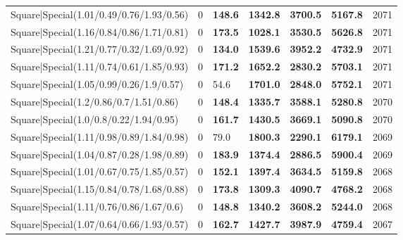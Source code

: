 \begin{tabular}{lrllllr}
 Square|Special(1.01/0.49/0.76/1.93/0.56)                      &             0   & \textbf{148.6} & \textbf{1342.8} & \textbf{3700.5} & \textbf{5167.8} &         2071 \\
 Square|Special(1.16/0.84/0.86/1.71/0.81)                      &             0   & \textbf{173.5} & \textbf{1028.1} & \textbf{3530.5} & \textbf{5626.8} &         2071 \\
 Square|Special(1.21/0.77/0.32/1.69/0.92)                      &             0   & \textbf{134.0} & \textbf{1539.6} & \textbf{3952.2} & \textbf{4732.9} &         2071 \\
 Square|Special(1.11/0.74/0.61/1.85/0.93)                      &             0   & \textbf{171.2} & \textbf{1652.2} & \textbf{2830.2} & \textbf{5703.1} &         2071 \\
 Square|Special(1.05/0.99/0.26/1.9/0.57)                       &             0   & 54.6           & \textbf{1701.0} & \textbf{2848.0} & \textbf{5752.1} &         2071 \\
 Square|Special(1.2/0.86/0.7/1.51/0.86)                        &             0   & \textbf{148.4} & \textbf{1335.7} & \textbf{3588.1} & \textbf{5280.8} &         2070 \\
 Square|Special(1.0/0.8/0.22/1.94/0.95)                        &             0   & \textbf{161.7} & \textbf{1430.5} & \textbf{3669.1} & \textbf{5090.8} &         2070 \\
 Square|Special(1.11/0.98/0.89/1.84/0.98)                      &             0   & 79.0           & \textbf{1800.3} & \textbf{2290.1} & \textbf{6179.1} &         2069 \\
 Square|Special(1.04/0.87/0.28/1.98/0.89)                      &             0   & \textbf{183.9} & \textbf{1374.4} & \textbf{2886.5} & \textbf{5900.4} &         2069 \\
 Square|Special(1.01/0.67/0.75/1.85/0.57)                      &             0   & \textbf{152.1} & \textbf{1397.4} & \textbf{3634.5} & \textbf{5159.8} &         2068 \\
 Square|Special(1.15/0.84/0.78/1.68/0.88)                      &             0   & \textbf{173.8} & \textbf{1309.3} & \textbf{4090.7} & \textbf{4768.2} &         2068 \\
 Square|Special(1.11/0.76/0.86/1.67/0.6)                       &             0   & \textbf{148.8} & \textbf{1340.2} & \textbf{3608.2} & \textbf{5244.0} &         2068 \\
 Square|Special(1.07/0.64/0.66/1.93/0.57)                      &             0   & \textbf{162.7} & \textbf{1427.7} & \textbf{3987.9} & \textbf{4759.4} &         2067 \\

\end{tabular}
